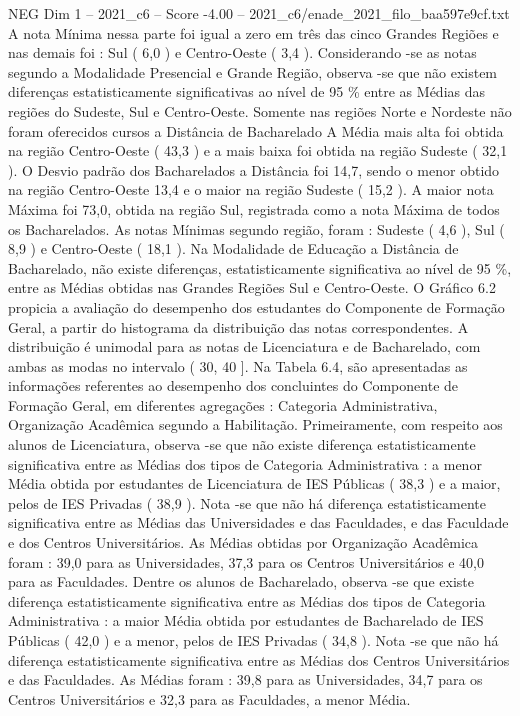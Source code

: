 \begin{textsample}{NEG Dim 1 – 2021\_c6 – Score -4.00 – 2021\_c6/enade\_2021\_filo\_baa597e9cf.txt}
A nota Mínima nessa parte foi igual a zero em três das cinco Grandes Regiões e nas demais foi : Sul ( 6,0 ) e Centro-Oeste ( 3,4 ).
Considerando -se as notas segundo a Modalidade Presencial e Grande Região, observa -se que não existem diferenças estatisticamente significativas ao nível de 95 \% entre as Médias das regiões do Sudeste, Sul e Centro-Oeste.
Somente nas regiões Norte e Nordeste não foram oferecidos cursos a Distância de Bacharelado A Média mais alta foi obtida na região Centro-Oeste ( 43,3 ) e a mais baixa foi obtida na região Sudeste ( 32,1 ).
O Desvio padrão dos Bacharelados a Distância foi 14,7, sendo o menor obtido na região Centro-Oeste 13,4 e o maior na região Sudeste ( 15,2 ).
A maior nota Máxima foi 73,0, obtida na região Sul, registrada como a nota Máxima de todos os Bacharelados.
As notas Mínimas segundo região, foram : Sudeste ( 4,6 ), Sul ( 8,9 ) e Centro-Oeste ( 18,1 ).
Na Modalidade de Educação a Distância de Bacharelado, não existe diferenças, estatisticamente significativa ao nível de 95 \%, entre as Médias obtidas nas Grandes Regiões Sul e Centro-Oeste.
O Gráfico 6.2 propicia a avaliação do desempenho dos estudantes do Componente de Formação Geral, a partir do histograma da distribuição das notas correspondentes.
A distribuição é unimodal para as notas de Licenciatura e de Bacharelado, com ambas as modas no intervalo ( 30, 40 ].
Na Tabela 6.4, são apresentadas as informações referentes ao desempenho dos concluintes do Componente de Formação Geral, em diferentes agregações : Categoria Administrativa, Organização Acadêmica segundo a Habilitação.
Primeiramente, com respeito aos alunos de Licenciatura, observa -se que não existe diferença estatisticamente significativa entre as Médias dos tipos de Categoria Administrativa : a menor Média obtida por estudantes de Licenciatura de IES Públicas ( 38,3 ) e a maior, pelos de IES Privadas ( 38,9 ).
Nota -se que não há diferença estatisticamente significativa entre as Médias das Universidades e das Faculdades, e das Faculdade e dos Centros Universitários.
As Médias obtidas por Organização Acadêmica foram : 39,0 para as Universidades, 37,3 para os Centros Universitários e 40,0 para as Faculdades.
Dentre os alunos de Bacharelado, observa -se que existe diferença estatisticamente significativa entre as Médias dos tipos de Categoria Administrativa : a maior Média obtida por estudantes de Bacharelado de IES Públicas ( 42,0 ) e a menor, pelos de IES Privadas ( 34,8 ).
Nota -se que não há diferença estatisticamente significativa entre as Médias dos Centros Universitários e das Faculdades.
As Médias foram : 39,8 para as Universidades, 34,7 para os Centros Universitários e 32,3 para as Faculdades, a menor Média.

\end{textsample}
